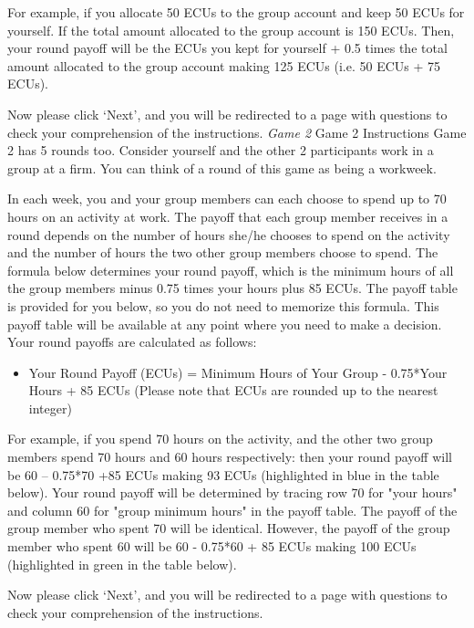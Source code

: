 For example, if you allocate 50 ECUs to the group account and keep 50 ECUs for yourself. If the total amount allocated to the group account is 150 ECUs. Then, your round payoff will be the ECUs you kept for yourself + 0.5 times the total amount allocated to the group account making 125 ECUs (i.e. 50 ECUs + 75 ECUs).

Now please click ‘Next’, and you will be redirected to a page with questions to check your comprehension of the instructions.
\newline
\textit{Game 2}
\newline
Game 2 Instructions
\newline
Game 2 has 5 rounds too. Consider yourself and the other 2 participants work in a group at a firm. You can think of a round of this game as being a workweek.

In each week, you and your group members can each choose to spend up to 70 hours on an activity at work. The payoff that each group member receives in a round depends on the number of hours she/he chooses to spend on the activity and the number of hours the two other group members choose to spend. The formula below determines your round payoff, which is the minimum hours of all the group members minus 0.75 times your hours plus 85 ECUs. The payoff table is provided for you below, so you do not need to memorize this formula. This payoff table will be available at any point where you need to make a decision. Your round payoffs are calculated as follows:
\begin{itemize}
    \item Your Round Payoff (ECUs) = Minimum Hours of Your Group - 0.75*Your Hours + 85 ECUs (Please note that ECUs are rounded up to the nearest integer)
\end{itemize}


For example, if you spend 70 hours on the activity, and the other two group members spend 70 hours and 60 hours respectively: then your round payoff will be 60 – 0.75*70 +85 ECUs making 93 ECUs (highlighted in blue in the table below). Your round payoff will be determined by tracing row 70 for "your hours" and column 60 for "group minimum hours" in the payoff table. The payoff of the group member who spent 70 will be identical. However, the payoff of the group member who spent 60 will be 60 - 0.75*60 + 85 ECUs making 100 ECUs (highlighted in green in the table below).

Now please click ‘Next’, and you will be redirected to a page with questions to check your comprehension of the instructions.

